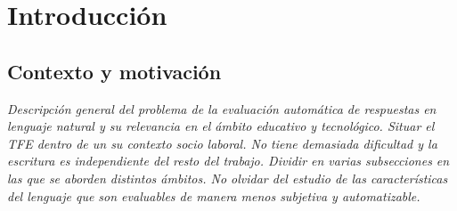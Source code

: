 
\chapter{Introducción}

\section{Contexto y motivación}
\textit{Descripción general del problema de la evaluación automática de respuestas en lenguaje natural y su relevancia en el ámbito educativo y tecnológico. Situar el TFE dentro de un su contexto socio laboral. No tiene demasiada dificultad y la escritura es independiente del resto del trabajo. Dividir en varias subsecciones en las que se aborden distintos ámbitos. No olvidar del estudio de las características del lenguaje que son evaluables de manera menos subjetiva y automatizable.}

